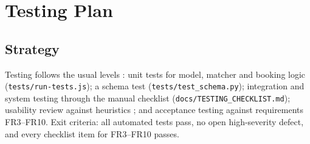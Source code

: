 \documentclass[11pt,a4paper]{article}
\begin{document}
\section{Testing Plan}
\subsection{Strategy}
Testing follows the usual levels \cite{myers2011}: unit tests for model, matcher and booking logic (\texttt{tests/run-tests.js}); a schema test (\texttt{tests/test\_schema.py}); integration and system testing through the manual checklist (\texttt{docs/TESTING\_CHECKLIST.md}); usability review against heuristics \cite{nielsen1994}; and acceptance testing against requirements FR3--FR10. Exit criteria: all automated tests pass, no open high-severity defect, and every checklist item for FR3--FR10 passes.
\end{document}
